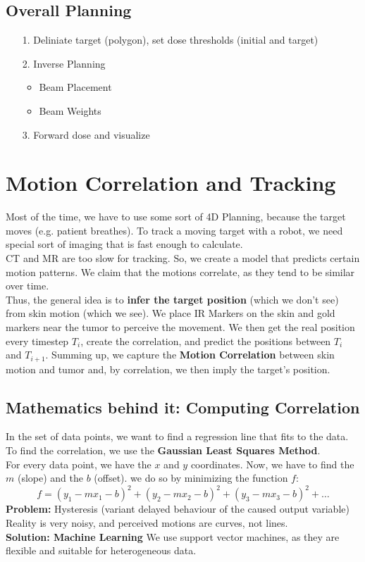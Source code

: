 \documentclass{exerciseBlue}
\begin{document}
\subsection{Overall Planning}
\begin{enumerate}
	\item[1.] Deliniate target (polygon), set dose thresholds (initial and target)
	\item[2.] Inverse Planning \begin{itemize}
		\item Beam Placement
		\item Beam Weights
	\end{itemize}
\item[3.] Forward dose and visualize
\end{enumerate}
\section{Motion Correlation and Tracking}
Most of the time, we have to use some sort of 4D Planning, because the target moves (e.g. patient breathes). To track a moving target with a robot, we need special sort of imaging that is fast enough to calculate.\\
CT and MR are too slow for tracking. So, we create a model that predicts certain motion patterns. We claim that the motions correlate, as they tend to be similar over time.\\
Thus, the general idea is to \textbf{infer the target position} (which we don't see) from skin motion (which we see). We place IR Markers on the skin and gold markers near the tumor to perceive the movement. We then get the real position every timestep $T_i$, create the correlation, and predict the positions between $T_i$ and $T_{i+1}$. Summing up, we capture the \textbf{Motion Correlation} between skin motion and tumor and, by correlation, we then imply the target's position. \\
\subsection{Mathematics behind it: Computing Correlation}
In the set of data points, we want to find a regression line that fits to the data. To find the correlation, we use the \textbf{Gaussian Least Squares Method}.\\
For every data point, we have the $x$ and $y$ coordinates. Now, we have to find the $m$ (slope) and the $b$ (offset). we do so by minimizing the function $f$:
$$f = (y_1-mx_1-b)^2+(y_2-mx_2-b)^2+(y_3-mx_3-b)^2+\dots$$
\textbf{Problem:} Hysteresis (variant delayed behaviour of the caused output variable)\\
Reality is very noisy, and perceived motions are curves, not lines.\\
\textbf{Solution: Machine Learning}
We use support vector machines, as they are flexible and suitable for heterogeneous data.
\end{document}

